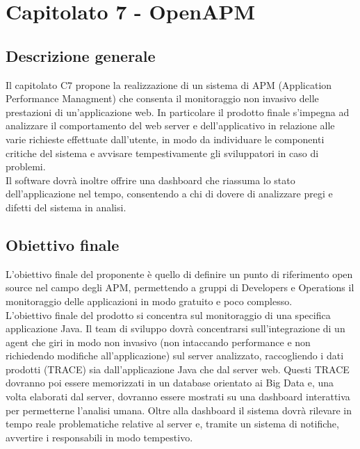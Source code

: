 \documentclass[main.tex]{subfiles}
\begin{document}
\chapter{Capitolato 7 - OpenAPM}
\section{Descrizione generale}
Il capitolato C7 propone la realizzazione di un sistema di APM (Application Performance Managment) che consenta il monitoraggio non invasivo delle prestazioni di un'applicazione web. In particolare il prodotto finale s'impegna ad analizzare il comportamento del web server e dell'applicativo in relazione alle varie richieste effettuate dall'utente, in modo da individuare le componenti critiche del sistema e avvisare tempestivamente gli sviluppatori in caso di problemi.\\
Il software dovrà inoltre offrire una dashboard che riassuma lo stato dell'applicazione nel tempo, consentendo a chi di dovere di analizzare pregi e difetti del sistema in analisi.
\section{Obiettivo finale}
L'obiettivo finale del proponente è quello di definire un punto di riferimento open source nel campo degli APM, permettendo a gruppi di Developers e Operations il monitoraggio delle applicazioni in modo gratuito e poco complesso.\\
L'obiettivo finale del prodotto si concentra sul monitoraggio di una specifica applicazione Java. Il team di sviluppo dovrà concentrarsi sull'integrazione di un agent che giri in modo non invasivo (non intaccando performance e non richiedendo modifiche all'applicazione) sul server analizzato, raccogliendo i dati prodotti (TRACE) sia dall'applicazione Java che dal server web. Questi TRACE dovranno poi essere memorizzati in un database orientato ai Big Data e, una volta elaborati dal server, dovranno essere mostrati su una dashboard interattiva per permetterne l'analisi umana. Oltre alla dashboard il sistema dovrà rilevare in tempo reale problematiche relative al server e, tramite un sistema di notifiche, avvertire i responsabili in modo tempestivo.
\end{document}
